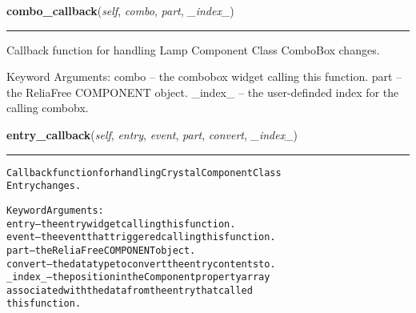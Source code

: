     \label{reliafree:miscellaneous:lamp:Lamp:combo_callback}

    \vspace{0.5ex}

\hspace{.8\funcindent}\begin{boxedminipage}{\funcwidth}

    \raggedright \textbf{combo\_callback}(\textit{self}, \textit{combo}, \textit{part}, \textit{\_index\_})

    \vspace{-1.5ex}

    \rule{\textwidth}{0.5\fboxrule}
\setlength{\parskip}{2ex}
    Callback function for handling Lamp Component Class ComboBox changes.

    Keyword Arguments: combo   -- the combobox widget calling this 
    function. part    -- the ReliaFree COMPONENT object. \_index\_ -- the 
    user-definded index for the calling combobx.

\setlength{\parskip}{1ex}
    \end{boxedminipage}

    \label{reliafree:miscellaneous:lamp:Lamp:entry_callback}

    \vspace{0.5ex}

\hspace{.8\funcindent}\begin{boxedminipage}{\funcwidth}

    \raggedright \textbf{entry\_callback}(\textit{self}, \textit{entry}, \textit{event}, \textit{part}, \textit{convert}, \textit{\_index\_})

    \vspace{-1.5ex}

    \rule{\textwidth}{0.5\fboxrule}
\setlength{\parskip}{2ex}
\begin{alltt}
Callback function for handling Crystal Component Class
Entry changes.

Keyword Arguments:
entry   -- the entry widget calling this function.
event   -- the event that triggered calling this function.
part    -- the ReliaFree COMPONENT object.
convert -- the data type to convert the entry contents to.
\_index\_ -- the position in the Component property array
           associated with the data from the entry that called
           this function.
\end{alltt}

\setlength{\parskip}{1ex}
    \end{boxedminipage}

